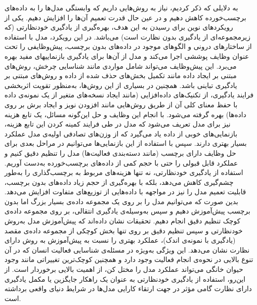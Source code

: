 به دلایلی که ذکر کردیم، نیاز به روش‌هایی داریم که وابستگی مدل‌ها را به داده‌های برچسب‌خورده کاهش دهیم و در عین حال قدرت تعمیم آن‌ها را افزایش دهیم. یکی از رویکردهای نوین برای رسیدن به این هدف، بهره‌گیری از یادگیری خودنظارتی
(که زیرمجموعه‌ای از یادگیری بدون نظارت است)
می‌باشد. در این رویکرد، مدل با استفاده از ساختارهای درونی و الگوهای موجود در داده‌های بدون برچسب، پیش‌وظایفی را تحت عنوان
وظایف پوششی
اجرا می‌کند و مدل از آن‌ها برای یادگیری
بازنماییهای
مفید بهره می‌برد. این پیش‌وظایف می‌تواند شامل مواردی مانند شناسایی چرخش\cite{gidaris2018unsupervised}،
روش‌های مبتنی بر ایجاد داده مانند تکمیل بخش‌های حذف شده از داده\cite{he2022masked}
و روش‌های مبتنی بر یادگیری تباینی\cite{chen2020simple,grill2020bootstrap,caron2020unsupervised}
باشد. همچنین در بسیاری از این روش‌ها، به‌منظور تقویت اثربخشی فرایند یادگیری، از تکنیک‌های
داده‌افزایی
(مانند ایجاد نسخه‌های متغیر از یک نمونه‌ی داده با حفظ معنای کلی آن از طریق روش‌هایی مانند افزودن نویز و ایجاد برش بر روی داده‌ها) بهره گرفته می‌شود. با انجام این وظایف و حل این‌گونه مسائل، یک تابع هزینه نیز برای مدل تعریف می‌شود که مدل در طی فرایند کمینه کردن این تابع هزینه، بازنمایی‌های خوبی از داده یاد می‌گیرد که از وزن‌های تصادفی اولیه‌ی مدل عملکرد بسیار بهتری دارند.
سپس با استفاده از این بازنمایی‌ها می‌توانیم در مراحل بعدی برای حل وظایف دارای برچسب (مانند دسته‌بندی فعالیت‌ها) مدل را
تنظیم دقیق
کنیم و عملکرد قابل قبولی را حتی با حجم کمی از داده‌های برچسب‌خورده به‌دست آوریم\cite{gidaris2018unsupervised}.
استفاده از یادگیری خودنظارتی، نه تنها هزینه‌های مربوط به برچسب‌گذاری را به‌طور چشم‌گیری کاهش می‌دهد، بلکه با بهره‌گیری از حجم زیاد داده‌های بدون برچسب، قابلیت تعمیم مدل را نیز در مواجهه با داده‌هایی از توزیع‌های متفاوت افزایش می‌دهد. بدین صورت که می‌توانیم مدل را بر روی یک مجموعه داده‌ی بسیار بزرگ اما بدون برچسب پیش‌آموزش دهیم و سپس به‌وسیله‌ی
یادگیری انتقالی،
بر روی مجموعه داده‌ی کوچک تنظیم دقیق انجام دهیم. تحقیقات نشان داده‌اند که پیش‌آموزش مدل به‌روش خودنظارتی و سپس تنظیم دقیق بر روی تنها بخش کوچکی از مجموعه داده‌ی مقصد
(یادگیری با نمونه‌ی اندک)،
عملکرد بهتری را نسبت به پیش‌آموزش به روش دارای نظارت نشان می‌دهد\cite{chen2020big,yuan2024self}.
این ویژگی به‌ویژه در مسئله‌ی شناسایی فعالیت انسان که در آن تنوع بالایی در نحوه‌ی انجام فعالیت وجود دارد و همچنین کوچک‌ترین تغییراتی مانند وجود حیوان خانگی می‌تواند عملکرد مدل را مختل کن، از اهمیت بالایی برخوردار است. از این‌رو، استفاده از یادگیری خودنظارتی به عنوان یک راهکار جایگزین یا مکمل یادگیری دارای نظارت گامی مؤثر در جهت ارتقاء کارایی مدل‌ها در شرایط دنیای واقعی برداشته است.

